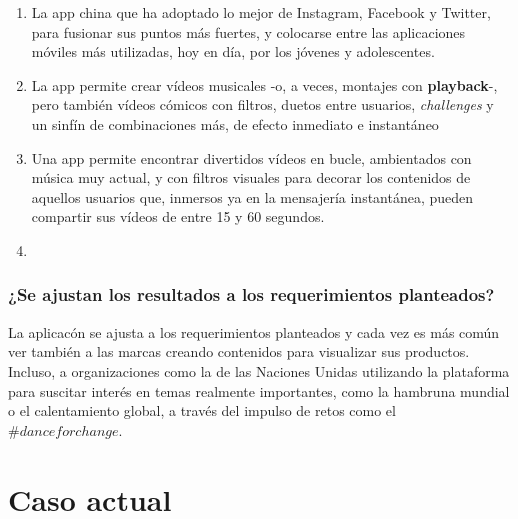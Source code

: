 \documentclass[titlepage,a4paper,twoside]{article}
\theoremstyle{definition}
\numberwithin{algorithm}{section}
\theoremstyle{remark}
\numberwithin{equation}{section}
\begin{document}
    
    \begin{enumerate}
    	\item La app china que ha adoptado lo mejor de Instagram, Facebook y Twitter, para fusionar sus puntos más fuertes, y colocarse entre las aplicaciones móviles más utilizadas, hoy en día, por los jóvenes y adolescentes.
    	\item La app permite crear vídeos musicales -o, a veces, montajes con \textbf{playback}-, pero también vídeos cómicos con filtros, duetos entre usuarios, \textit{challenges} y un sinfín de combinaciones más, de efecto inmediato e instantáneo
    	\item Una app permite encontrar divertidos vídeos en bucle, ambientados con música muy actual, y con filtros visuales para decorar los contenidos de aquellos usuarios que, inmersos ya en la mensajería instantánea, pueden compartir sus vídeos de entre 15 y 60 segundos.
    	\item 
    \end{enumerate}
    
    
    \subsubsection{¿Se ajustan los resultados a los requerimientos planteados?}
    
    La aplicacón se ajusta a los requerimientos planteados y cada vez es más común ver también a las marcas creando contenidos para visualizar sus productos. Incluso, a organizaciones como la de las Naciones Unidas utilizando la plataforma para suscitar interés en temas realmente importantes, como la hambruna mundial o el calentamiento global, a través del impulso de retos como el $\#danceforchange.$
    
    
    \section{Caso actual}
    
\end{document}
